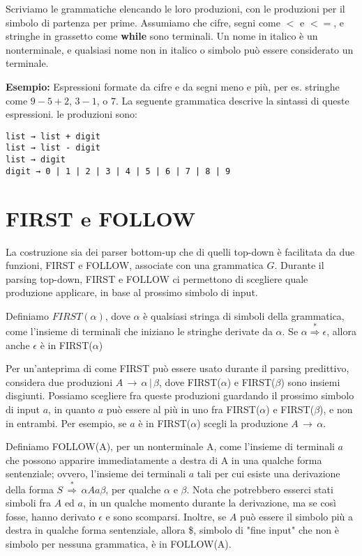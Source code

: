 Scriviamo le grammatiche elencando le loro produzioni, con le produzioni per il simbolo di partenza per prime. Assumiamo che cifre, segni come \textbf{$<$} e \textbf{$<=$}, e stringhe in grassetto come \textbf{while} sono terminali. Un nome in italico è un nonterminale, e qualsiasi nome non in italico o simbolo può essere considerato un terminale.

\textbf{Esempio:} Espressioni formate da cifre e da segni meno e più, per es. stringhe come $9-5+2$, $3-1$, o $7$. La seguente grammatica descrive la sintassi di queste espressioni. le produzioni sono:
\begin{verbatim}
list → list + digit 
list → list - digit 
list → digit
digit → 0 | 1 | 2 | 3 | 4 | 5 | 6 | 7 | 8 | 9
\end{verbatim}

\section{FIRST e FOLLOW}
La costruzione sia dei parser bottom-up che di quelli top-down è facilitata da due funzioni, FIRST e FOLLOW, associate con una grammatica $G$. Durante il parsing top-down, FIRST e FOLLOW ci permettono di scegliere quale produzione applicare, in base al prossimo simbolo di input.

Definiamo $FIRST(\alpha)$, dove $\alpha$ è qualsiasi stringa di simboli della grammatica, come l'insieme di terminali che iniziano le stringhe derivate da $\alpha$. Se $\alpha \overset{*}{\Rightarrow }  \epsilon$, allora anche $\epsilon$ è in FIRST($\alpha$)

Per un'anteprima di come FIRST può essere usato durante il parsing predittivo, considera due produzioni $A \, \rightarrow \, \alpha \, | \, \beta$, dove FIRST($\alpha$) e FIRST($\beta$) sono insiemi disgiunti. Possiamo scegliere fra queste produzioni guardando il prossimo simbolo di input $a$, in quanto $a$ può essere al più in uno fra FIRST($\alpha$) e FIRST($\beta$), e non in entrambi. Per esempio, se $a$ è in FIRST($\alpha$) scegli la produzione $A \, \rightarrow \, \alpha $.

Definiamo FOLLOW(A), per un nonterminale A, come l'insieme di terminali $a$ che possono apparire immediatamente a destra di A in una qualche forma sentenziale; ovvero, l'insieme dei terminali $a$ tali per cui esiste una derivazione della forma $S\, \overset{*}{\Rightarrow } \, \alpha A a \beta$, per qualche $\alpha$ e $\beta$. Nota che potrebbero esserci stati simboli fra $A$ ed $a$, in un qualche momento durante la derivazione, ma se così fosse, hanno derivato $\epsilon$ e sono scomparsi. Inoltre, se $A$ può essere il simbolo più a destra in qualche forma sentenziale, allora \$, simbolo di "fine input" che non è simbolo per nessuna grammatica, è in FOLLOW(A).

